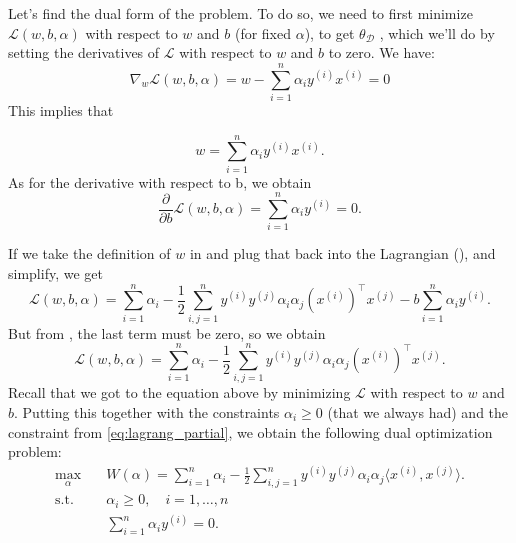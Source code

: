Let's find the dual form of the problem. To do so, we need to first
minimize $\mathcal L(w,b,\alpha)$ with respect to $w$ and $b$ (for fixed $\alpha$), to get $\theta_{\mathcal D}$ , which
we'll do by setting the derivatives of $\mathcal L$ with respect to $w$ and $b$ to zero. We
have:
\begin{equation*}
\nabla_w \mathcal L(w,b,\alpha) = w - \sum_{i=1}^n \alpha_i y^{(i)} x^{(i)} = 0
\end{equation*}
This implies that

\begin{equation}
    w = \sum_{i=1}^n \alpha_i y^{(i)} x^{(i)}.\label{eq:w_alpha_dual}
\end{equation}
As for the derivative with respect to b, we obtain
\begin{equation}
    \frac{\partial}{\partial b} \mathcal L(w,b,\alpha) = \sum_{i=1}^n \alpha_i y^{(i)} = 0.\label{eq:lagrang_partial}
\end{equation}

If we take the definition of $w$ in  and plug that back into
the Lagrangian (), and simplify, we get
\begin{equation}
    \mathcal L(w,b,\alpha) = \sum_{i=1}^n \alpha_i - \frac{1}{2} \sum_{i,j=1}^n y^{(i)} y^{(j)} \alpha_i \alpha_j (x^{(i)} )^\top x^{(j)} - b \sum_{i=1}^n \alpha_i y^{(i)}.
\end{equation}
But from , the last term must be zero, so we obtain
\begin{equation*}
    \mathcal L(w,b,\alpha) = \sum_{i=1}^n \alpha_i - \frac{1}{2} \sum_{i,j=1}^n y^{(i)} y^{(j)} \alpha_i \alpha_j (x^{(i)} )^\top x^{(j)}.    
\end{equation*}
Recall that we got to the equation above by minimizing $\mathcal L$ with respect to $w$
and $b$. Putting this together with the constraints $\alpha_i \ge 0$ (that we always had)
and the constraint from \cref{eq:lagrang_partial}, we obtain the following dual optimization problem:
\begin{align}
    \max_{\alpha} \quad& W(\alpha) = \sum_{i=1}^n \alpha_i - \frac{1}{2} \sum_{i,j=1}^n y^{(i)} y^{(j)} \alpha_i \alpha_j \langle x^{(i)} ,x^{(j)} \rangle.\label{eq:opt_problem_dual}\\
    \operatorname{s.t.} \quad& \alpha_i \ge 0, \quad i = 1,\ldots ,n\\
    \quad& \sum_{i=1}^n \alpha_i y^{(i)} = 0. %
\end{align}


